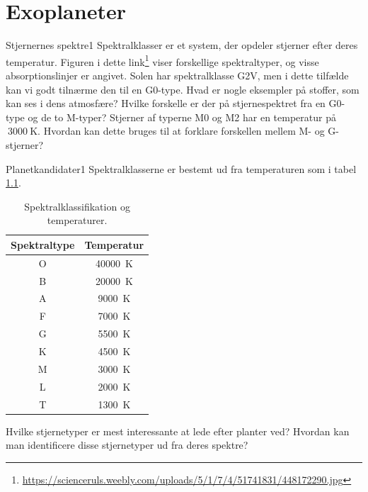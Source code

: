 \chapter{Exoplaneter}
%
%
\begin{opgave}{Stjernernes spektre}{1}
Spektralklasser er et system, der opdeler stjerner efter deres temperatur. Figuren i dette link\footnote{\url{https://scienceruls.weebly.com/uploads/5/1/7/4/51741831/448172290.jpg}} viser forskellige spektraltyper, og visse absorptionslinjer er angivet. %
\opg Solen har spektralklasse G2V, men i dette tilfælde kan vi godt
tilnærme den til en G0-type. Hvad er nogle eksempler på stoffer,
som kan ses i dens atmosfære?
\opg Hvilke forskelle er der på stjernespektret fra en G0-type og de to M-typer?
\opg Stjerner af typerne M0 og M2 har en temperatur på $~\SI{3000}{\kelvin}$. Hvordan kan dette bruges til at forklare forskellen mellem M- og G-stjerner?
\end{opgave}
%
%
\begin{opgave}{Planetkandidater}{1}
Spektralklasserne er bestemt ud fra temperaturen som i tabel \ref{tab:spektral}.
\def\arraystretch{1.1}
\begin{table}[h!]
	\centering 
	\begin{tabular}{c|c}
		\textbf{Spektraltype} & \textbf{Temperatur} \\ \hline
		O             & \SI{40000}{\kelvin} \\
		B             & \SI{20000}{\kelvin} \\
		A             & \SI{9000}{\kelvin} \\
		F             & \SI{7000}{\kelvin} \\
		G             & \SI{5500}{\kelvin} \\
		K             & \SI{4500}{\kelvin} \\
		M             & \SI{3000}{\kelvin} \\
		L             & \SI{2000}{\kelvin} \\
		T             & \SI{1300}{\kelvin}          
	\end{tabular}
	\caption{Spektralklassifikation og temperaturer.}
	\label{tab:spektral}
\end{table}
\opg Hvilke stjernetyper er mest interessante at lede efter planter ved?
\opg Hvordan kan man identificere disse stjernetyper ud fra deres spektre?
\end{opgave}
